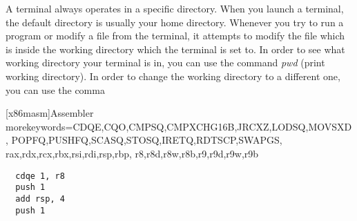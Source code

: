 A terminal always operates in a specific directory. When you launch a terminal, the default directory is usually your home directory.
Whenever you try to run a program or modify a file from the terminal, it attempts to modify the file which is inside the working directory which the terminal is set to.
In order to see what working directory your terminal is in, you can use the command \emph{pwd} (print working directory).
In order to change the working directory to a different one, you can use the comma

   [x86masm]{Assembler} %
   {morekeywords={CDQE,CQO,CMPSQ,CMPXCHG16B,JRCXZ,LODSQ,MOVSXD, %
                  POPFQ,PUSHFQ,SCASQ,STOSQ,IRETQ,RDTSCP,SWAPGS, %
                  rax,rdx,rcx,rbx,rsi,rdi,rsp,rbp, %
                  r8,r8d,r8w,r8b,r9,r9d,r9w,r9b}} %

\lstset{language=[x64]Assembler}

\begin{lstlisting}
  cdqe 1, r8
  push 1
  add rsp, 4
  push 1
\end{lstlisting}


